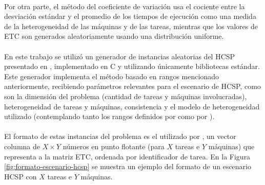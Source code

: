 \begin{table}[h!]
    \centering
    \caption{Parámetros de los modelos ETC}
    \label{table:parametros-etc}
\end{table}

\paragraph{}Por otra parte, el método del coeficiente de variación usa el cociente entre la desviación estándar y el promedio de los tiempos de ejecución como una medida de la heterogeneidad de las máquinas y de las tareas, mientras que los valores de ETC son generados aleatoriamente usando una distribución uniforme.

\paragraph{}En este trabajo se utilizó un generador de instancias aleatorias del HCSP presentado en \citet{bib-doctorado-nesmachnow}, implementado en C y utilizando únicamente bibliotecas estándar.
Este generador implementa el método basado en rangos mencionado anteriormente, recibiendo parámetros relevantes para el escenario de HCSP, como son la dimensión del problema (cantidad de tareas y máquinas involucradas), heterogeneidad de tareas y máquinas, consistencia y el modelo de heterogeneidad utilizado (contemplando tanto los rangos definidos por \citet{bib-ali-hc-etc} como por \citet{bib-braun}).

\paragraph{}El formato de estas instancias del problema es el utilizado por \citet{bib-braun}, un vector columna de $X \times Y$ números en punto flotante (para $X$ tareas e $Y$ máquinas) que representa a la matriz ETC, ordenada por identificador de tarea.
En la Figura \ref{fig:formato-escenario-hcsp} se muestra un ejemplo del formato de un escenario HCSP con $X$ tareas e $Y$ máquinas.
\\

